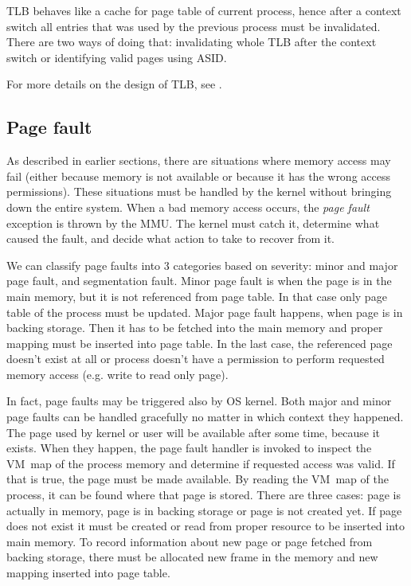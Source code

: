 TLB behaves like a cache for page table of current process, hence after a context switch all entries that was used by the previous process must be invalidated.
There are two ways of doing that: invalidating whole TLB after the context switch or identifying valid pages using ASID.

For more details on the design of TLB, see \cite{memorysystems}.

\subsection{Page fault}

As described in earlier sections, there are situations where memory access may fail
(either because memory is not available or because it has the wrong access permissions).
These situations must be handled by the kernel without bringing down the entire system.
When a bad memory access occurs, the {\it page fault} exception is thrown by the MMU.
The kernel must catch it, determine what caused the fault, and decide what action to take to recover from it.

We can classify page faults into 3 categories based on severity: minor and major page fault, and segmentation fault.
Minor page fault is when the page is in the main memory, but it is not referenced from page table.
In that case only page table of the process must be updated.
Major page fault happens, when page is in backing storage.
Then it has to be fetched into the main memory and proper mapping must be inserted into page table.
In the last case, the referenced page doesn't exist at all or process doesn't have a permission to perform requested memory access (e.g. write to read only page).

In fact, page faults may be triggered also by OS kernel.
Both major and minor page faults can be handled gracefully no matter in which context they happened.
The page used by kernel or user will be available after some time, because it exists.
When they happen, the page fault handler is invoked to inspect the VM~map of the process memory and determine if requested access was valid.
If that is true, the page must be made available.
By reading the VM~map of the process, it can be found where that page is stored.
There are three cases: page is actually in memory, page is in backing storage or page is not created yet.
If page does not exist it must be created or read from proper resource to be inserted into main memory.
To record information about new page or page fetched from backing storage, there must be allocated new frame in the memory and new mapping inserted into page table.

